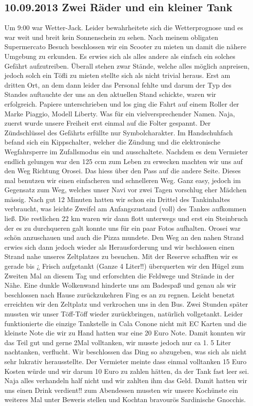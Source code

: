 \subsection{10.09.2013 Zwei Räder und ein kleiner Tank} 
Um 9:00 war Wetter-Jack.
Leider bewahrheitete sich die Wetterprognose und es war weit und breit kein Sonnenschein zu sehen.
Nach meinem obligaten Supermercato Besuch beschlossen wir ein Scooter zu mieten un damit die nähere Umgebung zu erkunden.
Es erwies sich als alles andere als einfach ein solches Gefährt aufzutreiben.
Überall stehen zwar Stände, welche alles möglich anpreisen, jedoch solch ein Töfli zu mieten stellte sich als nicht trivial heraus.
Erst am dritten Ort, an dem dann leider das Personal fehlte und darum der Typ des Standes auftauchte der uns an den aktuellen Stand schickte, waren wir erfolgreich.
Papiere unterschrieben und los ging die Fahrt auf einem Roller der Marke Piaggio, Modell Liberty.
Was für ein vielversprechender Namen.
Naja, zuerst wurde unsere Freiheit erst einmal auf die Folter gespannt.
Der Zündschlüssel des Gefährts erfüllte nur Symbolcharakter.
Im Handschuhfach befand sich ein Kippschalter, welcher die Zündung und die elektronische Wegfahrsperre im Zufallsmodus ein und ausschaltete.
Nachdem es dem Vermieter endlich gelungen war den 125 ccm zum Leben zu erwecken machten wir uns auf den Weg Richtung Orosei.
Das hiess über den Pass auf die andere Seite.
Dieses mal benutzen wir einen einfacheren und schnelleren Weg.
Ganz easy, jedoch im Gegensatz zum Weg, welches unser Navi vor zwei Tagen vorschlug eher Mädchen mässig.
Nach gut 12 Minuten hatten wir schon ein Drittel des Tankinhaltes verbraucht, was leichte Zweifel am Anfangszustand (voll) des Tankes aufkommen ließ.
Die restlichen 22 km waren wir dann flott unterwegs und erst ein Steinbruch der es zu durchqueren galt konnte uns für ein paar Fotos aufhalten.
Orosei war schön anzuschauen und auch die Pizza mundete.
Den Weg an den nahen Strand erwies sich dann jedoch wieder als Herausforderung und wir bschlossen einen Strand nahe unseres Zeltplatzes zu besuchen.
Mit der Reserve schafften wir es gerade bis ¿ Frisch aufgetankt (Ganze 4 Liter!!) überquerten wir den Hügel zum Zweiten Mal an diesem Tag und erforschten die Feldwege und Strände in der Nähe.
Eine dunkle Wolkenwand hinderte uns am Badespaß und genau als wir beschlossen nach Hause zurückzukehren Fing es an zu regnen.
Leicht benetzt erreichten wir den Zeltplatz und verkrochen uns in den Bus.
Zwei Stunden später mussten wir unser Töff-Töff wieder zurückbringen, natürlich vollgetankt.
Leider funktionierte die einzige Tankstelle in Cala Conone nicht mit EC Karten und die kleinste Note die wir zu Hand hatten war eine 20 Euro Note.
Damit konnten wir das Teil gut und gerne 2Mal volltanken, wir musste jedoch nur ca 1.
5 Liter nachtanken, verflucht.
Wir beschlossen das Ding so abzugeben, was sich als nicht sehr lukrativ herausstellte.
Der Vermieter meinte dass einmal volltanken 15 Euro Kosten würde und wir darum 10 Euro zu zahlen hätten, da der Tank fast leer sei.
Naja alles verhandeln half nicht und wir zahlten ihm das Geld.
Damit hatten wir uns einen Drink verdient!! zum Abendessen mussten wir unsere Kochünste ein weiteres Mal unter Beweris stellen und Kochtan bravourös Sardinische Gnocchis. 

